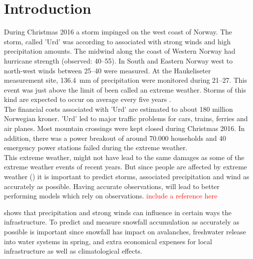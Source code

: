 \chapter{Introduction}
\label{ch:intro}
During Christmas 2016 a storm impinged on the west coast of Norway. The storm, called 'Urd' was according to \cite{olsen_ekstremvaerrapport._2017} associated with strong winds and high precipitation amounts. The midwind along the coast of Western Norway had hurricane strength (observed: \SIrange{40}{55}{\mPs}). In South and Eastern Norway west to north-west winds between \SIrange{25}{40}{\mPs} were measured. At the Haukeliseter measurement site, \SI{136.4}{\milli\metre} of precipitation were monitored during \SIrange{21}{27}{\dec}.
This event was just above the limit of been called an extreme weather. Storms of this kind are expected to occur on average every five years \citep{olsen_ekstremvaerrapport._2017}. \\ 
The financial costs associated with 'Urd' are estimated to about 180 million Norwegian kroner.
'Urd' led to major traffic problems for cars, trains, ferries and air planes. Most mountain crossings were kept closed during Christmas 2016. 
In addition, there was a power breakout of around 70.000 households and 40 emergency power stations failed during the extreme weather. 
\\
This extreme weather, might not have lead to the same damages as some of the extreme weather events of recent years. But since people are affected by extreme weather () it is important to predict storms, associated precipitation and wind as accurately as possible. Having accurate observations, will lead to better performing models which rely on observations. \textcolor{red}{include a reference here}

\newline
\noindent
{} shows that precipitation and strong winds can influence in certain ways the infrastructure. To predict and measure snowfall accumulation as accurately as possible is important since snowfall has impact on avalanches, freshwater release into water systems in spring, and extra economical expenses for local infrastructure as well as climatological effects. \\
